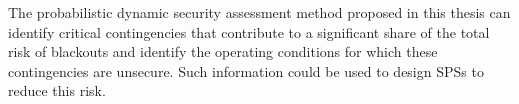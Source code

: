 The probabilistic dynamic security assessment method proposed in this thesis can identify critical contingencies that contribute to a significant share of the total risk of blackouts and identify the operating conditions for which these contingencies are unsecure. Such information could be used to design SPSs to reduce this risk.

